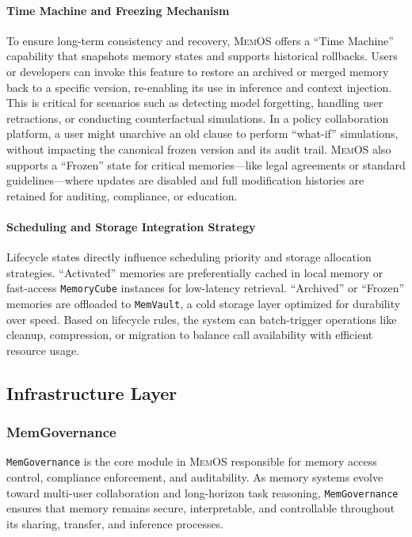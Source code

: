 \documentclass[]{memtensor}
\begin{document}
\paragraph{Time Machine and Freezing Mechanism}  
To ensure long-term consistency and recovery, \textsc{MemOS} offers a “Time Machine” capability that snapshots memory states and supports historical rollbacks.
Users or developers can invoke this feature to restore an archived or merged memory back to a specific version, re-enabling its use in inference and context injection.
This is critical for scenarios such as detecting model forgetting, handling user retractions, or conducting counterfactual simulations.
In a policy collaboration platform, a user might unarchive an old clause to perform “what-if” simulations, without impacting the canonical frozen version and its audit trail.
\textsc{MemOS} also supports a “Frozen” state for critical memories—like legal agreements or standard guidelines—where updates are disabled and full modification histories are retained for auditing, compliance, or education.

\paragraph{Scheduling and Storage Integration Strategy}  
Lifecycle states directly influence scheduling priority and storage allocation strategies.
“Activated” memories are preferentially cached in local memory or fast-access \texttt{MemoryCube} instances for low-latency retrieval.
“Archived” or “Frozen” memories are offloaded to \texttt{MemVault}, a cold storage layer optimized for durability over speed.
Based on lifecycle rules, the system can batch-trigger operations like cleanup, compression, or migration to balance call availability with efficient resource usage.

\subsection{Infrastructure Layer}

\subsubsection{MemGovernance}
\texttt{MemGovernance} is the core module in \textsc{MemOS} responsible for memory access control, compliance enforcement, and auditability.
As memory systems evolve toward multi-user collaboration and long-horizon task reasoning, \texttt{MemGovernance} ensures that memory remains secure, interpretable, and controllable throughout its sharing, transfer, and inference processes.
\end{document}
